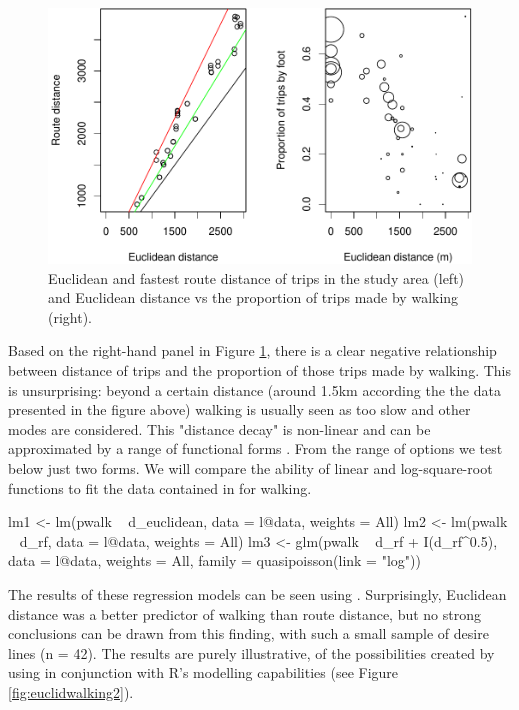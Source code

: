\begin{Schunk}
\begin{figure}
\includegraphics[width=1\linewidth]{euclidfastest-1} \caption[Euclidean and fastest route distance of trips in the study area (left) and Euclidean distance vs the proportion of trips made by walking (right)]{Euclidean and fastest route distance of trips in the study area (left) and Euclidean distance vs the proportion of trips made by walking (right).}\label{fig:euclidfastest}
\end{figure}
\end{Schunk}

Based on the right-hand panel in Figure \ref{fig:euclidfastest}, there
is a clear negative relationship between distance of trips and the
proportion of those trips made by walking. This is unsurprising: beyond
a certain distance (around 1.5km according the the data presented in the
figure above) walking is usually seen as too slow and other modes are
considered.
This "distance decay" is non-linear and can be approximated by a range of functional forms \citep{martinez_new_2013}.
From the range of
options we test below just two forms. We will compare the ability of
linear and log-square-root functions to fit the data contained in
 for walking.

\begin{Schunk}
\begin{Sinput}
lm1 <- lm(pwalk ~ d_euclidean, data = l@data, weights = All)
lm2 <- lm(pwalk ~ d_rf, data = l@data, weights = All)
lm3 <- glm(pwalk ~ d_rf + I(d_rf^0.5),
           data = l@data, weights = All, family = quasipoisson(link = "log"))
\end{Sinput}
\end{Schunk}

The results of these regression models can be seen using
. Surprisingly, Euclidean distance was a better
predictor of walking than route distance, but no strong conclusions can
be drawn from this finding, with such a small sample of desire lines (n
= 42). The results are purely illustrative, of the
possibilities created by using  in conjunction with R's
modelling capabilities (see Figure \ref{fig:euclidwalking2}).

